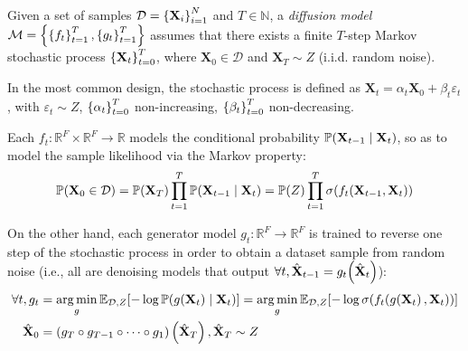 \begin{definition}
    Given a set of samples $\mathcal{D}=\mathopen{}\left\{\mathbf{X}_i\right\}_{i=1}^{N}$ and $T\in\mathbb{N}$, a \emph{diffusion model}~\cite{sohl-dickstein_deep_2015} $\mathcal{M}=\mathopen{}\left\{\mathopen{}\left\{f_t\right\}_{t=1}^{T},\mathopen{}\left\{g_t\right\}_{t=1}^{T}\right\}$ assumes that there exists a finite $T$-step Markov stochastic process $\mathopen{}\left\{\mathbf{X}_t\right\}_{t=0}^{T}$, where $\mathbf{X}_0 \in \mathcal{D}$ and $\mathbf{X}_T \sim Z$ (i.i.d. random noise). 

    In the most common design, the stochastic process is defined as $\mathbf{X}_t=\alpha_t \mathbf{X}_{0} + \beta_t \varepsilon_t $, with $\varepsilon_t \sim Z$, $\mathopen{}\left\{\alpha_t\right\}_{t=0}^{T}$ non-increasing, $\mathopen{}\left\{\beta_t\right\}_{t=0}^{T}$ non-decreasing.
    
    Each $f_t: \mathbb{R}^F \times \mathbb{R}^F \to \mathbb{R}$ models the conditional probability $\mathbb{P}\mathopen{}\left(\mathbf{X}_{t-1}\mid \mathbf{X}_t\right)$, so as to model the sample likelihood via the Markov property:
    \begin{equation}
    \mathbb{P}\mathopen{}\left(\mathbf{X}_0 \in \mathcal{D}\right)=\mathbb{P}\mathopen{}\left(\mathbf{X}_T\right)\prod_{t=1}^{T}{\mathbb{P}\mathopen{}\left(\mathbf{X}_{t-1} \mid \mathbf{X}_t\right)}=\mathbb{P}\mathopen{}\left(Z\right)\prod_{t=1}^{T}{\sigma\mathopen{}\left(f_t\mathopen{}\left(\mathbf{X}_{t-1}, \mathbf{X}_t\right)\right)}
    \end{equation}
    
    On the other hand, each generator model $g_t:\mathbb{R}^F \to \mathbb{R}^F$ is trained to reverse one step of the stochastic process in order to obtain a dataset sample from random noise (i.e., all are denoising models that output $\forall t, \hat{\mathbf{X}}_{t-1}=g_t\mathopen{}\left(\hat{\mathbf{X}}_t\right)$):
    \begin{align}   
    \begin{split}
    \forall t, g_t &= \operatorname*{arg\,min}_{g}{\mathbb{E}_{\mathcal{D},Z}\mathopen{}\left[-\log{\mathbb{P}\mathopen{}\left(g\mathopen{}\left(\mathbf{X}_t\right)\mid\mathbf{X}_t\right)}\right]}=\operatorname*{arg\,min}_{g}{\mathbb{E}_{\mathcal{D},Z}\mathopen{}\left[-\log{\sigma\mathopen{}\left(f_t\mathopen{}\left(g\mathopen{}\left(\mathbf{X}_t\right),\mathbf{X}_t\right)\right)}\right]} \\
    \hat{\mathbf{X}}_0 &= \mathopen{}\left(g_T \circ g_{T-1}\circ\dots\circ g_1\right)\mathopen{}\left(\hat{\mathbf{X}}_T\right),\hat{\mathbf{X}}_T\sim Z
    \end{split}
    \end{align}
\end{definition}

